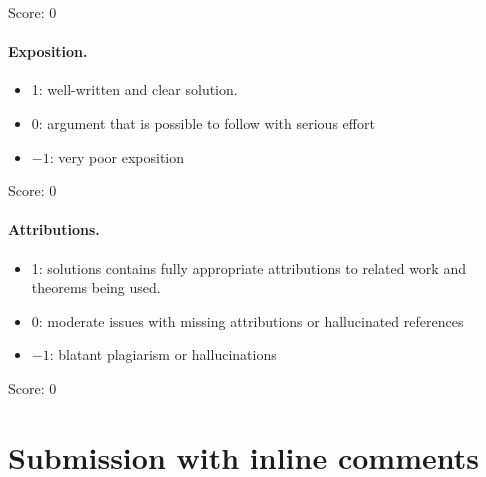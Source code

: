 \documentclass[11pt]{article}
\theoremstyle{definition}
\theoremstyle{remark}
\begin{document}
\noindent Score: 0


\paragraph{Exposition.}
\begin{itemize}
	\item  1: well-written and clear solution.
	\item  0: argument that is possible to follow with serious effort
	\item  $-1$: very poor exposition
\end{itemize}

\noindent Score: 0


\paragraph{Attributions.}
\begin{itemize}
	\item  1: solutions contains fully appropriate attributions
		to related work and theorems being used.
	\item  0: moderate issues with missing attributions or hallucinated references
	\item  $-1$: blatant plagiarism or hallucinations
\end{itemize}

\noindent Score: 0


\newpage
\section{Submission with inline comments}


\begin{abstract}
The problem considered here asks for an explicit identification of a reduced stated skein algebra of a punctured bigon with a generalized double of the full-weight quantum Borel algebras, followed by a diagonal quotient giving the simply-connected quantum group. We give a partial answer. At a specified generic parameter we compute the ordered double, its full diagonal quotient, and explicit inverse formulas for triangular quantum matrices. These yield a comparison theorem for an algebra satisfying a precise mixed exchange identity and a vector-space factorization. The proof retains the weight lattice and distinguishes gluing all weight Cartans from gluing only simple-root Cartans. The identification of these hypotheses with the designated skein algebra and its arc conventions remains unresolved; consequently neither requested isomorphism for the original objects is asserted.
\end{abstract}
\end{document}
